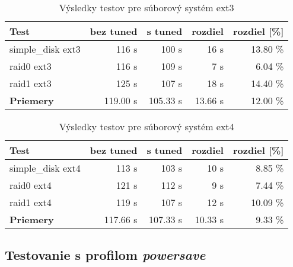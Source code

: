 \begin{table}[H]
\begin{center}
\begin{tabular}{|l|r|r|r|r|}
    \hline
    \textbf{Test} & \textbf{bez tuned} & \textbf{s tuned} & \textbf{rozdiel} & \textbf{rozdiel [\%]} \\ \hline
    simple\_disk ext3 & 116 s & 100 s & 16 s & 13.80 \% \\
    \hline
    raid0 ext3 & 116 s & 109 s & 7 s & 6.04 \% \\
    \hline
    raid1 ext3 & 125 s & 107 s & 18 s & 14.40 \% \\
    \hline
    \textbf{Priemery} & 119.00 s & 105.33 s & 13.66 s & 12.00 \% \\
    \hline
\end{tabular}
\caption{Výsledky testov pre súborový systém ext3}
\label{tab:results-ext3}
\end{center}
\end{table}

\begin{table}[H]
\begin{center}
\begin{tabular}{|l|r|r|r|r|}
    \hline
    \textbf{Test} & \textbf{bez tuned} & \textbf{s tuned} & \textbf{rozdiel} & \textbf{rozdiel [\%]} \\ \hline
    simple\_disk ext4 & 113 s & 103 s & 10 s & 8.85 \% \\
    \hline
    raid0 ext4 & 121 s & 112 s & 9 s & 7.44 \% \\
    \hline
    raid1 ext4 & 119 s & 107 s & 12 s & 10.09 \% \\
    \hline
    \textbf{Priemery} & 117.66 s & 107.33 s & 10.33 s & 9.33 \% \\
    \hline
\end{tabular}
\caption{Výsledky testov pre súborový systém ext4}
\label{tab:results-ext4}
\end{center}
\end{table}

\subsection{Testovanie s profilom \emph{powersave}}

